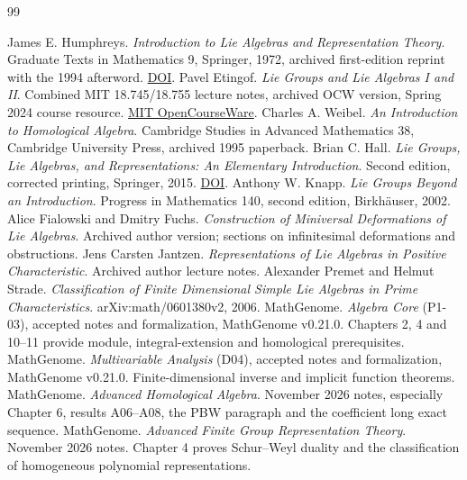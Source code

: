 \documentclass[11pt,oneside,openany]{book}
\theoremstyle{definition}
\theoremstyle{remark}
\begin{document}
\mainmatter











\backmatter
\begin{thebibliography}{99}
James E. Humphreys.
\emph{Introduction to Lie Algebras and Representation Theory}.
Graduate Texts in Mathematics 9, Springer, 1972, archived first-edition
reprint with the 1994 afterword.
\href{https://doi.org/10.1007/978-1-4612-6398-2}{DOI}.
Pavel Etingof.
\emph{Lie Groups and Lie Algebras I and II}.
Combined MIT 18.745/18.755 lecture notes, archived OCW version,
Spring 2024 course resource.
\href{https://ocw.mit.edu/courses/18-755-lie-groups-and-lie-algebras-ii-spring-2024/resources/mit18_755_s24_lec_full_pdf/}{MIT OpenCourseWare}.
Charles A. Weibel.
\emph{An Introduction to Homological Algebra}.
Cambridge Studies in Advanced Mathematics 38, Cambridge University
Press, archived 1995 paperback.
Brian C. Hall.
\emph{Lie Groups, Lie Algebras, and Representations: An Elementary
Introduction}. Second edition, corrected printing, Springer, 2015.
\href{https://doi.org/10.1007/978-3-319-13467-3}{DOI}.
Anthony W. Knapp.
\emph{Lie Groups Beyond an Introduction}.
Progress in Mathematics 140, second edition, Birkh\"auser, 2002.
Alice Fialowski and Dmitry Fuchs.
\emph{Construction of Miniversal Deformations of Lie Algebras}.
Archived author version; sections on infinitesimal deformations and
obstructions.
Jens Carsten Jantzen.
\emph{Representations of Lie Algebras in Positive Characteristic}.
Archived author lecture notes.
Alexander Premet and Helmut Strade.
\emph{Classification of Finite Dimensional Simple Lie Algebras in
Prime Characteristics}. arXiv:math/0601380v2, 2006.
MathGenome.
\emph{Algebra Core} (P1-03), accepted notes and formalization,
MathGenome v0.21.0. Chapters 2, 4 and 10--11 provide module,
integral-extension and homological prerequisites.
MathGenome.
\emph{Multivariable Analysis} (D04), accepted notes and formalization,
MathGenome v0.21.0. Finite-dimensional inverse and implicit function
theorems.
MathGenome.
\emph{Advanced Homological Algebra}.
November 2026 notes, especially Chapter 6, results A06--A08,
the PBW paragraph and the coefficient long exact sequence.
MathGenome.
\emph{Advanced Finite Group Representation Theory}.
November 2026 notes. Chapter 4 proves Schur--Weyl duality and
the classification of homogeneous polynomial representations.
\end{thebibliography}
\end{document}
